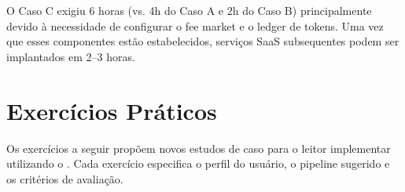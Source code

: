 \begin{observacao}
O Caso C exigiu 6 horas (vs. 4h do Caso A e 2h do Caso B)
principalmente devido à necessidade de configurar o fee market
e o ledger de tokens. Uma vez que esses componentes estão
estabelecidos, serviços SaaS subsequentes podem ser implantados
em 2--3 horas.
\end{observacao}

\section{Exercícios Práticos}
\label{sec:exercicios-casos}

Os exercícios a seguir propõem novos estudos de caso para o leitor
implementar utilizando o \opencodeeco{}. Cada exercício especifica
o perfil do usuário, o pipeline sugerido e os critérios de avaliação.

